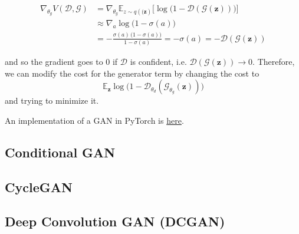 \documentclass{article}
\begin{document}
  \begin{align*} 
    \nabla_{\theta_g} V(\mathcal{D}, \mathcal{G}) & = \nabla_{\theta_g} \mathbb{E}_{z \sim q(\mathbf(\mathbf{z})} \big[ \log \big( 1 - \mathcal{D}(\mathcal{G}(\mathbf{z}))\big) \big] \\
                                                  & \approx \nabla_a \log \big( 1 - \sigma(a)\big) \\
                                                  & = - \frac{\sigma(a) \, \big( 1 - \sigma(a)\big)}{1 - \sigma(a)} = - \sigma(a) = - \mathcal{D}(\mathcal{G}(\mathbf{z})) 
  \end{align*} 

  and so the gradient goes to $0$ if $\mathcal{D}$ is confident, i.e. $\mathcal{D}(\mathcal{G}(\mathbf{z})) \rightarrow 0$. Therefore, we can modify the cost for the generator term by changing the cost to 
  \begin{equation}
    \mathbb{E}_{\mathbf{z}} \log \big( 1 - \mathcal{D}_{\theta_d} ( \mathcal{G}_{\theta_g} (\mathbf{z}))\big)
  \end{equation}
  and trying to minimize it. 


  \begin{theorem}[Convergence]
    \label{thm:convergence}
    
  \end{theorem}

  \begin{algo}
    An implementation of a GAN in PyTorch is \href{code/gan.html}{here}. 
  \end{algo}

\subsection{Conditional GAN} 

\subsection{CycleGAN}

\subsection{Deep Convolution GAN (DCGAN)} 




\end{document}
